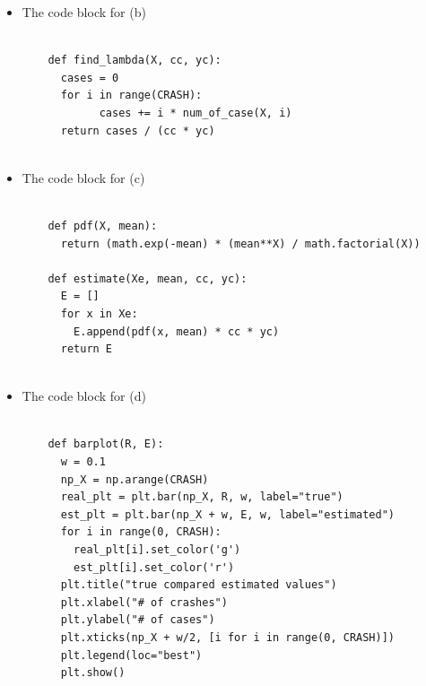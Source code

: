\documentclass[a4 paper]{article}
\numberwithin{equation}{section}
\newcommand{\0}{\mathbf{0}}
\begin{document}
\begin{itemize}
\begin{verbatim}
\end{verbatim}
	
	
	\item The code block for (b)\\
	\begin{verbatim}
               
    def find_lambda(X, cc, yc):
      cases = 0
      for i in range(CRASH):
            cases += i * num_of_case(X, i)
      return cases / (cc * yc)
  
\end{verbatim}
	\item The code block for (c)\\
	\begin{verbatim}
               
    def pdf(X, mean):
      return (math.exp(-mean) * (mean**X) / math.factorial(X))

    def estimate(Xe, mean, cc, yc):
      E = []
      for x in Xe:
        E.append(pdf(x, mean) * cc * yc)
      return E
  
\end{verbatim}
	\item The code block for (d)\\
	\begin{verbatim}
               
    def barplot(R, E):
      w = 0.1
      np_X = np.arange(CRASH)
      real_plt = plt.bar(np_X, R, w, label="true")
      est_plt = plt.bar(np_X + w, E, w, label="estimated")
      for i in range(0, CRASH):
        real_plt[i].set_color('g') 
        est_plt[i].set_color('r')
      plt.title("true compared estimated values")
      plt.xlabel("# of crashes")
      plt.ylabel("# of cases")
      plt.xticks(np_X + w/2, [i for i in range(0, CRASH)])
      plt.legend(loc="best")
      plt.show()
  
\end{verbatim}
\end{itemize}
\end{document}
